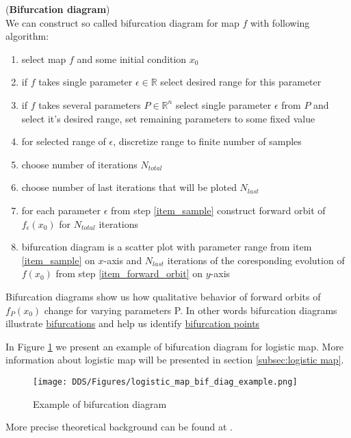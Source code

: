 \begin{definition} (\textbf{Bifurcation diagram}) \\
    \label{def: bif_diag}
    We can construct so called bifurcation diagram for map $f$ with following algorithm:
    \begin{enumerate}
        \item select map $f$ and some initial condition $x_0$
        \item if $f$ takes single parameter $\epsilon \in \mathbb{R}$ select desired range for this parameter
        \item if $f$ takes several parameters $P \in \mathbb{R}^n$ select single parameter $\epsilon$ from $P$ and select it's desired range, set remaining parameters to some fixed value
        \item for selected range of $\epsilon$, discretize range to finite number of samples \label{item_sample}
        \item choose number of iterations $N_{total}$
        \item choose number of last iterations that will be ploted $N_{last}$
        \item for each parameter $\epsilon$ from step \ref{item_sample} construct forward orbit of $f_{\epsilon}(x_0)$ for $N_{total}$ iterations \label{item_forward_orbit}
        \item bifurcation diagram is a scatter plot with parameter range from item \ref{item_sample} on $x$-axis and $N_{last}$ iterations of the coresponding evolution of $f(x_0)$ from step \ref{item_forward_orbit} on $y$-axis
    \end{enumerate}
\end{definition}

\begin{remark}
    Bifurcation diagrams show us how qualitative behavior of forward orbits of $f_P(x_0)$ change for varying parameters P.
    In other words bifurcation diagrams illustrate \hyperref[def:bifurcation]{bifurcations} and help us identify \hyperref[def:bifurcation_point]{bifurcation points}
\end{remark}

\begin{example}
    In Figure \ref{fig:bif_diag_example} we present an example of bifurcation diagram for logistic map. More information about logistic map will be presented in section \ref{subsec:logistic map}.
    \begin{figure}[!h]
        \centering
        \texttt{[image: DDS/Figures/logistic\_map\_bif\_diag\_example.png]}
        \caption{Example of bifurcation diagram}
        \label{fig:bif_diag_example}
    \end{figure}
\end{example}

More precise theoretical background can be found at \cite{Devaney20211026,Elaskar2017,Lynch2014}.

\endinput
